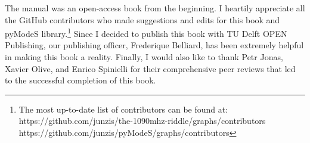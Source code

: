 {The manual was an open-access book from the beginning. I heartily appreciate all the GitHub contributors who made suggestions and edits for this book and pyModeS library.\footnote{The most up-to-date list of contributors can be found at: \\https://github.com/junzis/the-1090mhz-riddle/graphs/contributors \\https://github.com/junzis/pyModeS/graphs/contributors} Since I decided to publish this book with TU Delft OPEN Publishing, our publishing officer, Frederique Belliard, has been extremely helpful in making this book a reality. Finally, I would also like to thank Petr Jonas, Xavier Olive, and Enrico Spinielli for their comprehensive peer reviews that led to the successful completion of this book.
}